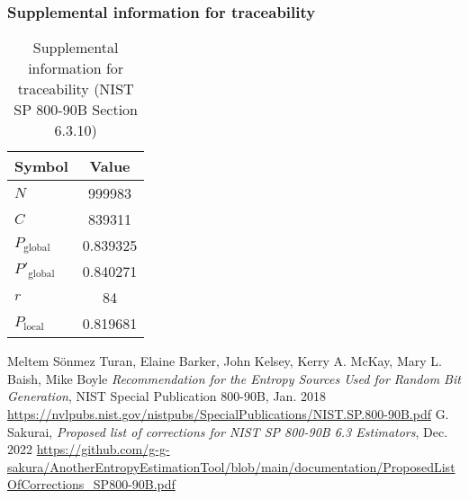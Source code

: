 \documentclass[a3paper,xelatex,english]{bxjsarticle}
\begin{document}
\subsubsection{Supplemental information for traceability}
\renewcommand{\arraystretch}{1.8}
\begin{table}[h]
\caption{Supplemental information for traceability (NIST SP 800-90B Section 6.3.10)}
\begin{center}
\begin{tabular}{|l|c|}
\hline 
\rowcolor{anotherlightblue} %
Symbol				& Value \\ \hline 
$N$				& 999983\\ \hline 
$C$				& 839311\\ \hline 
$P_{\textrm{global}}$				& 0.839325\\ \hline 
$P'_{\textrm{global}}$			& 0.840271\\ \hline 
$r$				& 84\\ \hline 
$P_{\textrm{local}}$ 			& 0.819681\\ \hline
\end{tabular}
\end{center}
\end{table}
\renewcommand{\arraystretch}{1.4}
\begin{thebibliography}{99}
Meltem S\"{o}nmez Turan,
Elaine Barker,
John Kelsey,
Kerry A. McKay,
Mary L. Baish,
Mike Boyle
\textit{Recommendation for the Entropy Sources Used for Random Bit Generation},
NIST Special Publication 800-90B, Jan. 2018 
\url{https://nvlpubs.nist.gov/nistpubs/SpecialPublications/NIST.SP.800-90B.pdf}
G. Sakurai, \textit{Proposed list of corrections for NIST SP 800-90B 6.3 Estimators}, Dec. 2022 
\url{https://github.com/g-g-sakura/AnotherEntropyEstimationTool/blob/main/documentation/ProposedListOfCorrections_SP800-90B.pdf}
\end{thebibliography}
\end{document}
